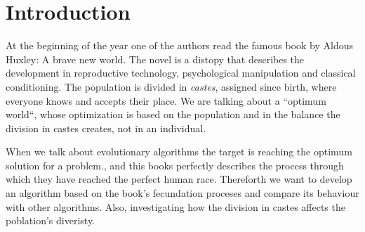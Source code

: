 \section{Introduction}

At the beginning of the year one of the authors read the famous book by Aldous Huxley: A brave new world. The novel
is a distopy that describes the development in reproductive technology, psychological manipulation and classical conditioning.
The population is divided in \textit{castes}, assigned since birth, where everyone knows and accepts their place. We are
talking about a ``optimum world``, whose optimization is based on the population and in the balance the division in 
castes creates, not in an individual.

When we talk about evolutionary algorithms the target is reaching the optimum solution for a problem., and this books
perfectly describes the process through which they have reached the perfect human race. Thereforth we want to develop
an algorithm based on the book's fecundation proceses and compare its behaviour with other algorithms. Also, investigating
how the division in castes affects the poblation's diveristy.

